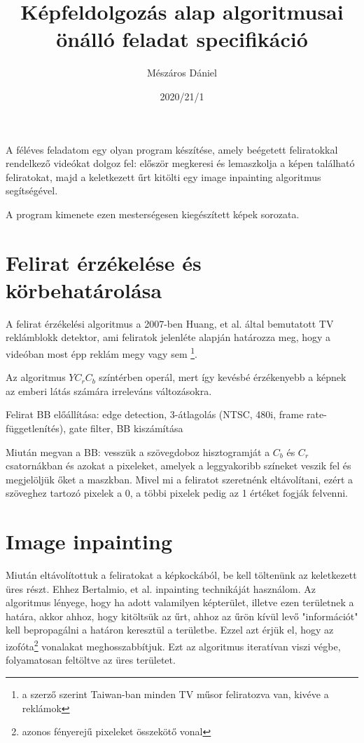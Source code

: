 \documentclass[10pt, draft]{article}
\begin{document}
\title{Képfeldolgozás alap algoritmusai önálló feladat specifikáció}
\author{Mészáros Dániel}
\date{2020/21/1}
\maketitle

A féléves feladatom egy olyan program készítése, amely beégetett feliratokkal
rendelkező videókat dolgoz fel: először megkeresi és lemaszkolja a képen
található feliratokat, majd a keletkezett űrt kitölti egy image inpainting
algoritmus segítségével.

A program kimenete ezen mesterségesen kiegészített képek sorozata.

\section{Felirat érzékelése és körbehatárolása}
A felirat érzékelési algoritmus a 2007-ben Huang, et al.
\cite{huang2007intelligent} által bemutatott TV reklámblokk detektor, ami
feliratok jelenléte alapján határozza meg, hogy a videóban most épp reklám megy
vagy sem \footnote{a szerző szerint Taiwan-ban minden TV műsor feliratozva van,
kivéve a reklámok}.

Az algoritmus $Y C_r C_b$ színtérben operál, mert így kevésbé érzékenyebb a
képnek az emberi látás számára irreleváns változásokra.

Felirat BB előállítása: edge detection, 3-átlagolás (NTSC, 480i, frame
rate-függetlenítés), gate filter, BB kiszámítása

Miután megvan a BB: vesszük a szövegdoboz hisztogramját a $C_b$ és $C_r$
csatornákban és azokat a pixeleket, amelyek a leggyakoribb színeket veszik fel
és megjelöljük őket a maszkban.
Mivel mi a feliratot szeretnénk eltávolítani, ezért a szöveghez tartozó
pixelek a 0, a többi pixelek pedig az 1 értéket fogják felvenni.
\cite{huang2007intelligent}

\section{Image inpainting}

Miután eltávolítottuk a feliratokat a képkockából, be kell töltenünk az
keletkezett üres részt.
Ehhez Bertalmio, et al. \cite{bertalmio2000image} inpainting technikáját
használom.
Az algoritmus lényege, hogy ha adott valamilyen képterület, illetve ezen
területnek a határa, akkor ahhoz, hogy kitöltsük az űrt, ahhoz az űrön kívül
levő "információt" kell bepropagálni a határon keresztül a területbe.
Ezzel azt érjük el, hogy az izofóta\footnote{azonos fényerejű pixeleket
összekötő vonal} vonalakat meghosszabbítjuk.
Ezt az algoritmus iteratívan viszi végbe, folyamatosan feltöltve az üres
területet.
\end{document}
